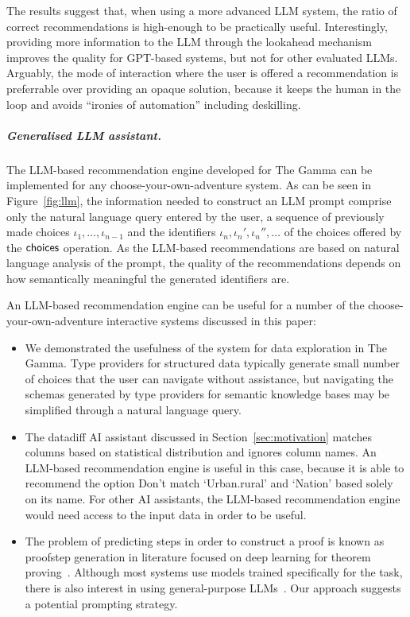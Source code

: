 \documentclass[ a4paper,UKenglish,cleveref, autoref, thm-restate]{lipics-v2021}
\newcommand{\ident}[1]{\textsf{#1}}
\newcommand{\choices}{\textnormal{\ident{choices}}}
\begin{document}
The results suggest that, when using a more advanced LLM system, the ratio of correct
recommendations is high-enough to be practically useful. Interestingly,  providing more
information to the LLM through the lookahead mechanism improves the quality for GPT-based systems,
but not for other evaluated LLMs. Arguably, the mode of interaction where the user is offered
a recommendation is preferrable over providing an opaque solution, because it keeps the human
in the loop \cite{sellen-2024-copilot} and avoids ``ironies of automation''
\cite{bainbridge-1983-ironies} including deskilling.

\subparagraph{Generalised LLM assistant.}
The LLM-based recommendation engine developed for The Gamma can be implemented for any
choose-your-own-adventure system. As can be seen in Figure~\ref{fig:llm}, the information needed
to construct an LLM prompt comprise only the natural language query entered by the user,
a sequence of previously made choices $\iota_1, \ldots, \iota_{n-1}$ and the identifiers
$\iota_n, \iota_n', \iota_n'', \ldots$ of the choices offered by the $\choices$ operation.
As the LLM-based recommendations are based on natural language analysis of the prompt,
the quality of the recommendations depends on how semantically meaningful the generated
identifiers are.

An LLM-based recommendation engine can be useful for a number of the choose-your-own-adventure
interactive systems discussed in this paper:

\begin{itemize}
\setlength{\itemsep}{5pt}
\item We demonstrated the usefulness of the system for data exploration in The Gamma.
  Type providers for structured data \cite{petricek-2016-fsdata} typically generate small number
  of choices that the user can navigate without assistance, but navigating the schemas generated by
  type providers for semantic knowledge bases \cite{syme-2012-inforich} may be simplified through a
  natural language query.
\item The datadiff AI assistant discussed in Section~\ref{sec:motivation} matches columns based
  on statistical distribution and ignores column names. An LLM-based recommendation engine is
  useful in this case, because it is able to recommend the option \ident{Don't match
  `Urban.rural' and `Nation'} based solely on its name. For other AI assistants, the LLM-based
  recommendation engine would need access to the input data in order to be useful.
\item The problem of predicting steps in order to construct a proof is known as
  proofstep generation in literature focused on deep learning for theorem
  proving~\cite{zhaoyu-2024-deep}. Although most systems use models trained specifically for the
  task, there is also interest in using general-purpose LLMs~\cite{zhang-2023-proofs}.
  Our approach suggests a potential prompting strategy.
\end{itemize}
\end{document}
